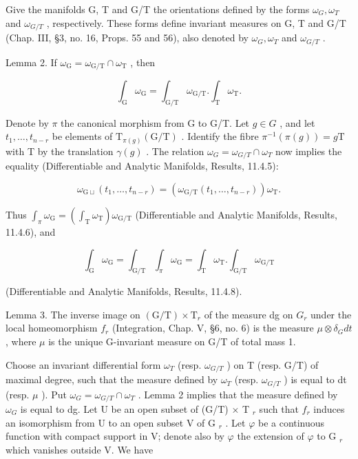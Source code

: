 Give the manifolds G, T and G/T the orientations defined by the forms \(\omega_{G}, \omega_{T}\) and \(\omega_{G/T}\) , respectively. These forms define invariant measures on G, T and G/T (Chap. III, §3, no. 16, Props. 55 and 56), also denoted by \(\omega_{G}, \omega_{T}\) and \(\omega_{G/T}\) .

Lemma 2. If \(\omega_{\mathrm{G}} = \omega_{\mathrm{G / T}}\cap \omega_{\mathrm{T}}\) , then

\[
\int_ {\mathrm{G}} \omega_ {\mathrm{G}} = \int_ {\mathrm{G/T}} \omega_ {\mathrm{G/T}}. \int_ {\mathrm{T}} \omega_ {\mathrm{T}}.
\]

Denote by \(\pi\) the canonical morphism from G to G/T. Let \(g \in G\) , and let \(t_{1}, \ldots, t_{n-r}\) be elements of \(\mathrm{T}_{\pi(g)}(\mathrm{G}/\mathrm{T})\) . Identify the fibre \(\pi^{-1}(\pi(g)) = g\mathrm{T}\) with T by the translation \(\gamma(g)\) . The relation \(\omega_{G} = \omega_{G/T} \cap \omega_{T}\) now implies the equality (Differentiable and Analytic Manifolds, Results, 11.4.5):

\[
\omega_ {\mathrm{G} \sqcup} (t _ {1}, \dots , t _ {n - r}) = (\omega_ {\mathrm{G} / \mathrm{T}} (t _ {1}, \dots , t _ {n - r})) \omega_ {\mathrm{T}}.
\]

Thus \(\int_{\pi}\omega_{\mathrm{G}} = \left(\int_{\mathrm{T}}\omega_{\mathrm{T}}\right)\omega_{\mathrm{G / T}}\) (Differentiable and Analytic Manifolds, Results, 11.4.6), and

\[
\int_ {\mathrm{G}} \omega_ {\mathrm{G}} = \int_ {\mathrm{G/T}} \int_ {\pi} \omega_ {\mathrm{G}} = \int_ {\mathrm{T}} \omega_ {\mathrm{T}}. \int_ {\mathrm{G/T}} \omega_ {\mathrm{G/T}}
\]

(Differentiable and Analytic Manifolds, Results, 11.4.8).

Lemma 3. The inverse image on \((\mathrm{G}/\mathrm{T}) \times \mathrm{T}_{r}\) of the measure dg on \(G_{r}\) under the local homeomorphism \(f_{r}\) (Integration, Chap. V, §6, no. 6) is the measure \(\mu \otimes \delta_{G} dt\) , where \(\mu\) is the unique G-invariant measure on G/T of total mass 1.

Choose an invariant differential form \(\omega_{T}\) (resp. \(\omega_{G/T}\) ) on T (resp. G/T) of maximal degree, such that the measure defined by \(\omega_{T}\) (resp. \(\omega_{G/T}\) ) is equal to dt (resp. \(\mu\) ). Put \(\omega_{G} = \omega_{G/T} \cap \omega_{T}\) . Lemma 2 implies that the measure defined by \(\omega_{G}\) is equal to dg. Let U be an open subset of (G/T) × T \(_{r}\) such that \(f_{r}\) induces an isomorphism from U to an open subset V of G \(_{r}\) . Let \(\varphi\) be a continuous function with compact support in V; denote also by \(\varphi\) the extension of \(\varphi\) to G \(_{r}\) which vanishes outside V. We have

